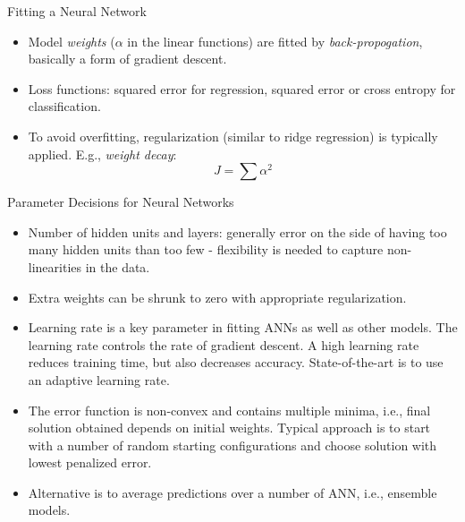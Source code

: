 \documentclass[aspectratio=169]{beamer}
\begin{document}
\begin{frame}{Fitting a Neural Network}
    \begin{itemize}
        \item Model \textit{weights} ($\alpha$ in the linear functions) are fitted by \textit{back-propogation}, basically a form of gradient descent.
        \item Loss functions: squared error for regression, squared error or cross entropy for classification.
        \item To avoid overfitting, regularization (similar to ridge regression) is typically applied. E.g., \textit{weight decay}:
        \begin{equation*}
            J = \sum \alpha^2
        \end{equation*}
    \end{itemize}
\end{frame}


\begin{frame}{Parameter Decisions for Neural Networks}
    \begin{itemize}
        \item Number of hidden units and layers: generally error on the side of having too many hidden units than too few - flexibility is needed to capture non-linearities in the data.
        \item Extra weights can be shrunk to zero with appropriate regularization.
        \item Learning rate is a key parameter in fitting ANNs as well as other models. The learning rate controls the rate of gradient descent. A high learning rate reduces training time, but also decreases accuracy. State-of-the-art is to use an adaptive learning rate. 
        \item The error function is non-convex and contains multiple minima, i.e., final solution obtained depends on initial weights. Typical approach is to start with a number of random starting configurations and choose solution with lowest penalized error.
        \item Alternative is to average predictions over a number of ANN, i.e., ensemble models.
    \end{itemize}
\end{frame}
\end{document}
